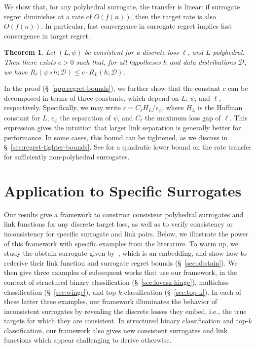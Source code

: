 \documentclass[11pt]{article}
\newcommand{\D}{\mathcal{D}}
\newtheorem{theorem}{Theorem}
\begin{document}
We show that, for any polyhedral surrogate, the transfer is linear: if surrogate regret diminishes at a rate of $O(f(n))$, then the target rate is also $O(f(n))$.
In particular, fast convergence in surrogate regret implies fast convergence in target regret.
\begin{theorem}
  \label{thm:linear-regret-bound}
  Let $(L,\psi)$ be consistent for a discrete loss $\ell$, and $L$ polyhedral.
  Then there exists $c > 0$ such that, for all hypotheses $h$ and data distributions $\D$, we have $R_{\ell}(\psi \circ h;\D) \leq c \cdot R_L(h;\D)$.
\end{theorem}
In the proof (\S~\ref{app:regret-bounds}), we further show that the constant $c$ can be decomposed in terms of three constants, which depend on $L$, $\psi$, and $\ell$, respectively.
Specifically, we may write $c = C_\ell H_L / \epsilon_\psi$, where $H_L$ is the Hoffman constant for $L$, $\epsilon_\psi$ the separation of $\psi$, and $C_\ell$ the maximum loss gap of $\ell$.
This expression gives the intuition that larger link separation is generally better for performance.
In some cases, this bound can be tightened, as we discuss in \S~\ref{sec:regret-tighter-bounds}.
See \citet{frongillo2021surrogate} for a quadratic lower bound on the rate transfer for sufficiently non-polyhedral surrogates.


\section{Application to Specific Surrogates}\label{sec:applications}

Our results give a framework to construct consistent polyhedral surrogates and link functions for any discrete target loss, as well as to verify consistency or inconsistency for specific surrogate and link pairs.
Below, we illustrate the power of this framework with specific examples from the literature.
To warm up, we study the abstain surrogate given by~\citet{ramaswamy2018consistent}, which is an embedding, and show how to rederive their link function and surrogate regret bounds (\S~\ref{sec:abstain}). 
We then give three examples of subsequent works that use our framework, in the context of structured binary classification (\S~\ref{sec:lovasz-hinge}), multiclass classification (\S~\ref{sec:winge}), and top-$k$ classification (\S~\ref{sec:top-k}).
In each of these latter three examples, our framework illuminates the behavior of inconsistent surrogates by revealing the discrete losses they embed, i.e., the true targets for which they are consistent.
In structured binary classification and top-$k$ classification, our framework also gives new consistent surrogates and link functions which appear challenging to derive otherwise.
\end{document}
